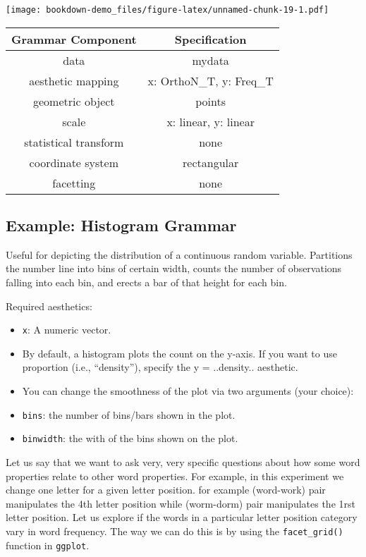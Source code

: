 \documentclass[]{book}
\begin{document}
\texttt{[image: bookdown-demo\_files/figure-latex/unnamed-chunk-19-1.pdf]}

\begin{longtable}[]{@{}cc@{}}
\toprule
Grammar Component & Specification\tabularnewline
\midrule
\endhead
data & mydata\tabularnewline
aesthetic mapping & x: OrthoN\_T, y: Freq\_T\tabularnewline
geometric object & points\tabularnewline
scale & x: linear, y: linear\tabularnewline
statistical transform & none\tabularnewline
coordinate system & rectangular\tabularnewline
facetting & none\tabularnewline
\bottomrule
\end{longtable}

\subsection{Example: Histogram Grammar}\label{example-histogram-grammar}

Useful for depicting the distribution of a continuous random variable.
Partitions the number line into bins of certain width, counts the number
of observations falling into each bin, and erects a bar of that height
for each bin.

Required aesthetics:

\begin{itemize}
\item
  \texttt{x}: A numeric vector.
\item
  By default, a histogram plots the count on the y-axis. If you want to
  use proportion (i.e., ``density''), specify the y = ..density..
  aesthetic.
\item
  You can change the smoothness of the plot via two arguments (your
  choice):
\item
  \texttt{bins}: the number of bins/bars shown in the plot.
\item
  \texttt{binwidth}: the with of the bins shown on the plot.
\end{itemize}

Let us say that we want to ask very, very specific questions about how
some word properties relate to other word properties. For example, in
this experiment we change one letter for a given letter position. for
example (word-work) pair manipulates the 4th letter position while
(worm-dorm) pair manipulates the 1rst letter position. Let us explore if
the words in a particular letter position category vary in word
frequency. The way we can do this is by using the \texttt{facet\_grid()}
function in \texttt{ggplot}.
\end{document}
